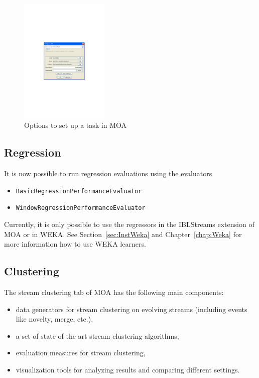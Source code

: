 \documentclass[a4paper,12pt,twoside]{book}
\begin{document}
\begin{figure}[t]
\begin{center}
\includegraphics[height=6cm]{images/Configure_Task}\end{center}
\caption{Options to set up a task in MOA}
\end{figure}

\subsection{Regression}

It is now possible to run regression evaluations using the evaluators
\begin{itemize}
\item {\tt BasicRegressionPerformanceEvaluator}  
\item {\tt WindowRegressionPerformanceEvaluator}
\end{itemize}
Currently, it is only possible to use the regressors in the IBLStreams extension of MOA or in WEKA.
See Section~\ref{sec:InstWeka} and Chapter~\ref{chap:Weka} for more information how to use WEKA learners. 


\subsection{Clustering}

The stream clustering tab of MOA has the following main components:
\begin{itemize}
	\item data generators for stream clustering on evolving streams (including events like novelty, merge, etc.),
	\item a set of state-of-the-art stream clustering algorithms,
	\item evaluation measures for stream clustering,
	\item visualization tools for analyzing results and comparing different settings.
\end{itemize}
\end{document}
